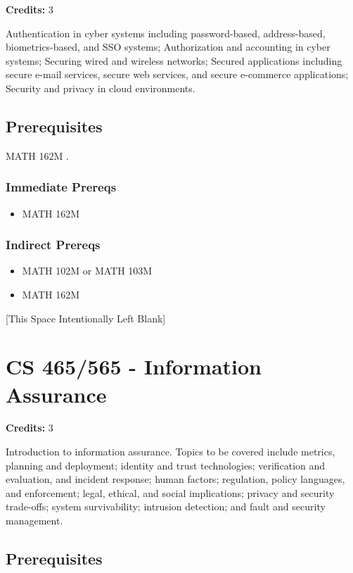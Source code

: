 \documentclass[]{article}
\providecommand{\tightlist}{%
  \setlength{\itemsep}{0pt}\setlength{\parskip}{0pt}}
\newcommand{\pagebreakhere}{
\vspace*{\fill}
\begin{center}
[This Space Intentionally Left Blank]
\end{center}
\vspace*{\fill}
\newpage
}
\begin{document}
\textbf{Credits:} 3

Authentication in cyber systems including password-based, address-based,
biometrics-based, and SSO systems; Authorization and accounting in cyber
systems; Securing wired and wireless networks; Secured applications
including secure e-mail services, secure web services, and secure
e-commerce applications; Security and privacy in cloud environments.

\subsection{Prerequisites}\label{prerequisites-41}

MATH 162M .

\subsubsection{Immediate Prereqs}\label{immediate-prereqs-32}

\begin{itemize}
\tightlist
\item
  MATH 162M
\end{itemize}

\subsubsection{Indirect Prereqs}\label{indirect-prereqs-32}

\begin{itemize}
\tightlist
\item
  MATH 102M or MATH 103M
\item
  MATH 162M
\end{itemize}

\pagebreakhere
\section{CS 465/565 - Information
Assurance}\label{cs-465565---information-assurance}

\textbf{Credits:} 3

Introduction to information assurance. Topics to be covered include
metrics, planning and deployment; identity and trust technologies;
verification and evaluation, and incident response; human factors;
regulation, policy languages, and enforcement; legal, ethical, and
social implications; privacy and security trade-offs; system
survivability; intrusion detection; and fault and security management.

\subsection{Prerequisites}\label{prerequisites-42}
\end{document}
